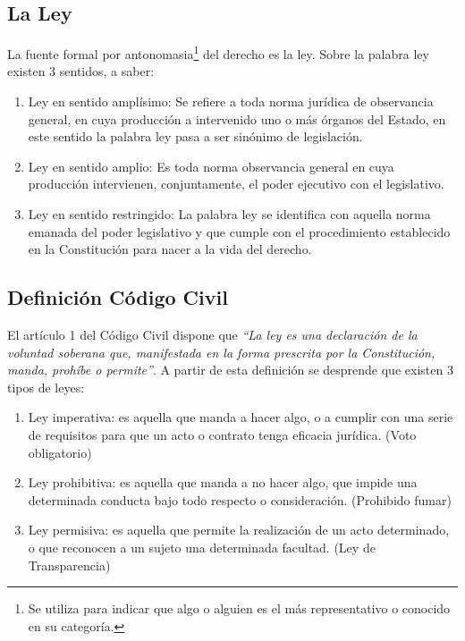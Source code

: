 \documentclass{templateApunte}
\begin{document}
\subsection{La Ley} \hypertarget{laLey}{}
La fuente formal por antonomasia\footnote{Se utiliza para indicar que algo o alguien es el más representativo o conocido en su categoría.} del derecho es la ley.
\newline
Sobre la palabra ley existen 3 sentidos, a saber:
\begin{enumerate}
  \item Ley en sentido ampl\'isimo: Se refiere a toda norma jurídica de observancia general, en cuya producción a intervenido uno o m\'as órganos del Estado, en este sentido la palabra ley pasa a ser sinónimo de legislación.
  \item Ley en sentido amplio: Es toda norma observancia general en cuya producción intervienen, conjuntamente, el poder ejecutivo con el legislativo.
  \item Ley en sentido restringido: La palabra ley se identifica con aquella norma emanada del poder legislativo y que cumple con el procedimiento establecido en la Constitución para nacer a la vida del derecho.
\end{enumerate}

\subsection{Definición Código Civil}
El artículo 1 del Código Civil dispone que \textit{``La ley es una declaración de la voluntad soberana que, manifestada en la forma prescrita por la Constitución, manda, prohíbe o permite''}.
A partir de esta definición se desprende que existen 3 tipos de leyes:
\begin{enumerate}
  \item Ley imperativa: es aquella que manda a hacer algo, o a cumplir con una serie de requisitos para que un acto o contrato tenga eficacia jurídica. (Voto obligatorio)
  \item Ley prohibitiva: es aquella que manda a no hacer algo, que impide una determinada conducta bajo todo respecto o consideración. (Prohibido fumar)
  \item Ley permisiva: es aquella que permite la realización de un acto determinado, o que reconocen a un sujeto una determinada facultad. (Ley de Transparencia)
\end{enumerate}

\newpage
\end{document}
